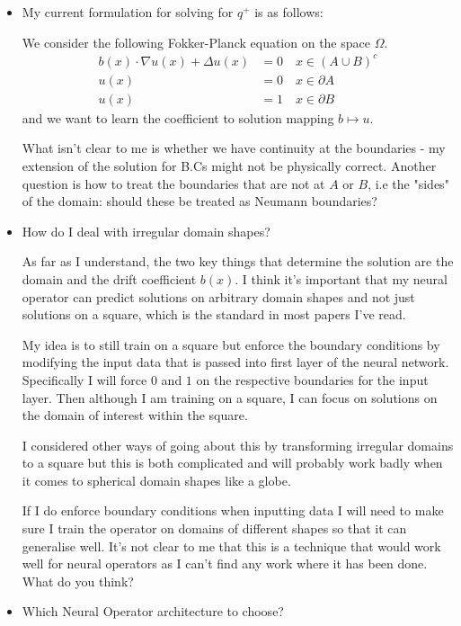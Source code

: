 \documentclass[ 11pt]{article}
\theoremstyle{definition}
\begin{document}
\begin{itemize}
    \item My current formulation for solving for $q^+$ is as follows:

    We consider the following Fokker-Planck equation on the space $\Omega$.
\begin{align*} \label{FPE_Formulation}
    b(x)\cdot \nabla u(x) + \Delta u(x) &= 0 \quad  x \in (A \cup B)^c \\
    u(x) & = 0 \quad x \in \partial A  \\
    u(x) & = 1 \quad x \in \partial B
\end{align*}
and we want to learn the coefficient to solution mapping $b \mapsto u$.

What isn't clear to me is whether we have continuity at the boundaries - my extension of the solution for B.Cs might not be physically correct. Another question is how to treat the boundaries that are not at $A$ or $B$, i.e the "sides" of the domain: should these be treated as Neumann boundaries? 

\item How do I deal with irregular domain shapes?

As far as I understand, the two key things that determine the solution are the domain and the drift coefficient $b(x)$. I think it's important that my neural operator can predict solutions on arbitrary domain shapes and not just solutions on a square, which is the standard in most papers I've read.

My idea is to still train on a square but enforce the boundary conditions by modifying the input data that is passed into first layer of the neural network. Specifically I will force  $0$ and $1$ on the respective boundaries for the input layer. Then although I am training on a square, I can focus on solutions on the domain of interest within the square.

I considered other ways of going about this by transforming irregular domains to a square but this is both complicated and will probably work badly when it comes to spherical domain shapes like a globe.

If I do enforce boundary conditions when inputting data I will need to make sure I train the operator on domains of different shapes so that it can generalise well. It's not clear to me that this is a technique that would work well for neural operators as I can't find any work where it has been done. What do you think?

\item Which Neural Operator architecture to choose?


\end{itemize}
\end{document}
